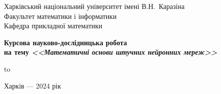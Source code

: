 \begin{titlepage}
	\begin{center}
		\Large Харківський національний університет імені В.Н.~Каразіна\\
		Факультет математики і інформатики\\
		Кафедра прикладної математики
	\end{center}

	\vfill
		
	\begin{center}	
		\LARGE \bfseries Курсова науково-дослідницька робота
		\\[0.5\baselineskip]
		{\mdseries на тему} \bfseries\slshape <<Математичні основи штучних нейронних мереж>> \\[0.5\baselineskip]
	\end{center}
	
	\vfill
	

	\setlength{\tabcolsep}{3pt}
	\hbox to 
	
\vspace{\baselineskip}
	
	\begin{center}
		Харків --- 2024 рік
	\end{center}
	
\end{titlepage}